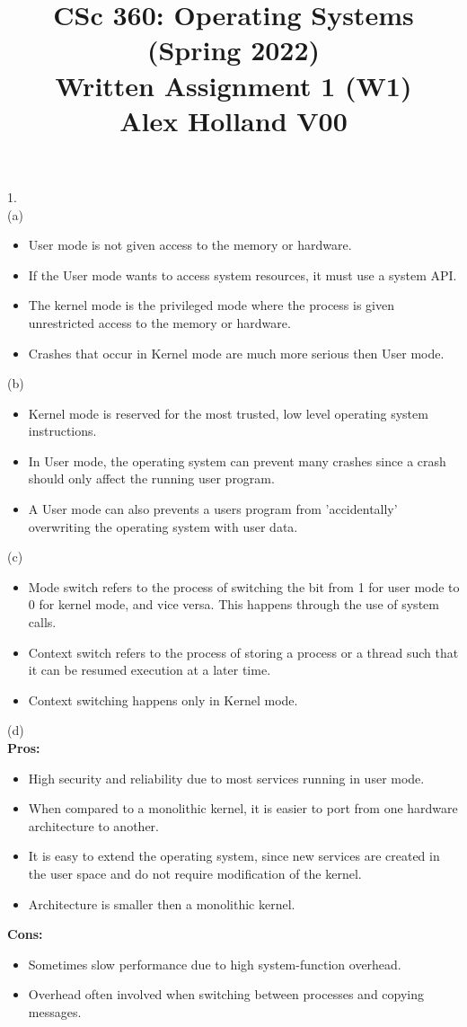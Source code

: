 \documentclass{article}
\title{%
   CSc 360: Operating Systems (Spring 2022) \\
   \large Written Assignment 1 (W1) \\
    Alex Holland V00}
\date{}
\begin{document}
\maketitle

1.\\
(a)
\begin{itemize}
  \item User mode is not given access to the memory or hardware.
  \item If the User mode wants to access system resources, it must use a system API.
  \item The kernel mode is the privileged mode where the process is given unrestricted access to the memory or hardware.
  \item Crashes that occur in Kernel mode are much more serious then User mode.
\end{itemize}

(b)
\begin{itemize}
    \item Kernel mode is reserved for the most trusted, low level operating system instructions.
    \item In User mode, the operating system can prevent many crashes since a crash should only affect the running user program.
    \item A User mode can also prevents a users program from 'accidentally' overwriting the operating system with user data.
\end{itemize}

(c)
\begin{itemize}
    \item Mode switch refers to the process of switching the bit from 1 for user mode to 0 for kernel mode, and vice versa. This happens through the use of system calls.
    \item Context switch refers to the process of storing a process or a thread such that it can be resumed execution at a later time.
    \item Context switching happens only in Kernel mode.
\end{itemize}

(d)\\
{\bf Pros:}
\begin{itemize}
    \item High security and reliability due to most services running in user mode.
    \item When compared to a monolithic kernel, it is easier to port from one hardware architecture to another. 
    \item It is easy to extend the operating system, since new services are created in the user space and do not require modification of the kernel.
    \item Architecture is smaller then a monolithic kernel.
\end{itemize}
{\bf Cons:}
\begin{itemize}
    \item Sometimes slow performance due to high system-function overhead.
    \item Overhead often involved when switching between processes and copying messages.
\end{itemize}
\end{document}
